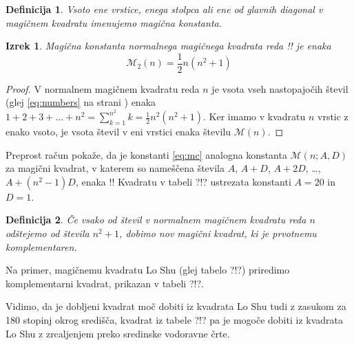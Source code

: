 \documentclass[a4paper,12pt]{article}
\newtheorem{izrek}{Izrek}
\newtheorem{definicija}{Definicija}
\newcommand{\m}{\mathcal{M}}
\newcommand{\pojem}[1]{\emph{\color{purple}#1}}
\begin{document}
\begin{definicija}
      Vsoto ene vrstice, enega stolpca ali ene od glavnih diagonal
      v magičnem kvadratu imenujemo \pojem{magična konstanta}.
\end{definicija}

   
   \begin{izrek}
      Magična konstanta normalnega magičnega kvadrata reda !!
      je enaka
      \begin{equation}
         \label{eq:mc}
         \mathcal{M}_2(n) = \frac{1}{2} n(n^2+1)
      \end{equation}
   \end{izrek}

  
  \begin{proof}
    V normalnem magičnem kvadratu reda $n$ je vsota vseh nastopajočih
    števil (glej \eqref{eq:numbers} na strani \pageref{eq:numbers}) enaka
    $1+2+3+\dots+n^2=\sum_{k=1}^{n^2}k=\frac{1}{2}n^2(n^2+1)$. Ker imamo
    v kvadratu $n$ vrstic z enako vsoto, je vsota števil v eni vrstici
    enaka številu $\m(n)$. %
  \end{proof}

Preprost račun pokaže, da je konstanti \eqref{eq:mc} analogna konstanta
$\m(n;A,D)$ za magični kvadrat, v katerem so nameščena števila
$A$, $A+D$, $A+2D$, \dots, $A+(n^2-1)D$, enaka %
!!
Kvadratu v tabeli ?!? ustrezata konstanti $A=20$ in $D=1$.

\begin{definicija}
      Če vsako od števil v normalnem magičnem kvadratu reda $n$ odštejemo
      od števila $n^2+1$, dobimo nov magični kvadrat, ki je prvotnemu
      \pojem{komplementaren}.
\end{definicija}

Na primer, magičnemu kvadratu Lo Shu (glej tabelo ?!?) priredimo
komplementarni kvadrat, prikazan v tabeli ?!?.
%

Vidimo, da je dobljeni kvadrat moč dobiti iz kvadrata Lo Shu tudi z zasukom za
180 stopinj okrog središča, kvadrat iz tabele ?!? pa je mogoče dobiti
iz kvadrata Lo Shu z zrcaljenjem preko sredinske vodoravne črte.
\end{document}

